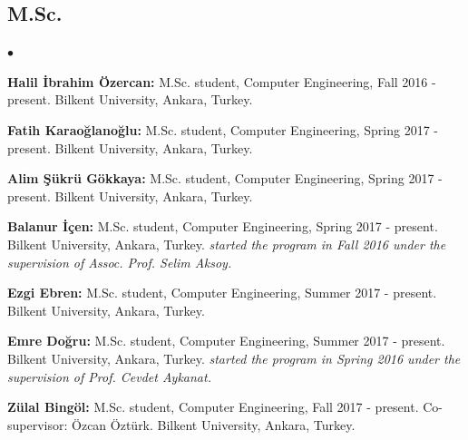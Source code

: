 \documentclass[margin,line]{res}
\newenvironment{list2}{
  \begin{list}{$\bullet$}{%
      \setlength{\itemsep}{0in}
      \setlength{\parsep}{0in} \setlength{\parskip}{0in}
      \setlength{\topsep}{0in} \setlength{\partopsep}{0in} 
      \setlength{\leftmargin}{0.2in}}}{\end{list}}
\begin{document}
\begin{resume}
\subsection{\small \sc M.Sc.}
\begin{list2}
\item
  {\bf Halil İbrahim Özercan:} M.Sc. student, Computer Engineering, Fall 2016 - present.
  Bilkent University, Ankara, Turkey. 
\item
  {\bf Fatih Karaoğlanoğlu:} M.Sc. student, Computer Engineering, Spring 2017 - present.
  Bilkent University, Ankara, Turkey. 
\item
  {\bf Alim Şükrü Gökkaya:} M.Sc. student, Computer Engineering, Spring 2017 - present.
  Bilkent University, Ankara, Turkey. 
\item
  {\bf Balanur İçen:} M.Sc. student, Computer Engineering, Spring 2017 - present.
  Bilkent University, Ankara, Turkey. {\it started the program in Fall 2016 under the supervision of Assoc. Prof. Selim Aksoy.}
\item
  {\bf Ezgi Ebren:} M.Sc. student, Computer Engineering, Summer 2017 - present.
  Bilkent University, Ankara, Turkey. 
\item
  {\bf Emre Doğru:} M.Sc. student, Computer Engineering, Summer 2017 - present.
  Bilkent University, Ankara, Turkey. {\it started the program in Spring 2016 under the supervision of Prof. Cevdet Aykanat.}
\item
  {\bf Zülal Bingöl:} M.Sc. student, Computer Engineering, Fall 2017 - present. Co-supervisor: Özcan Öztürk.
  Bilkent University, Ankara, Turkey. 
\end{list2}
  \vspace*{-.4cm}

\end{resume}
\end{document}
